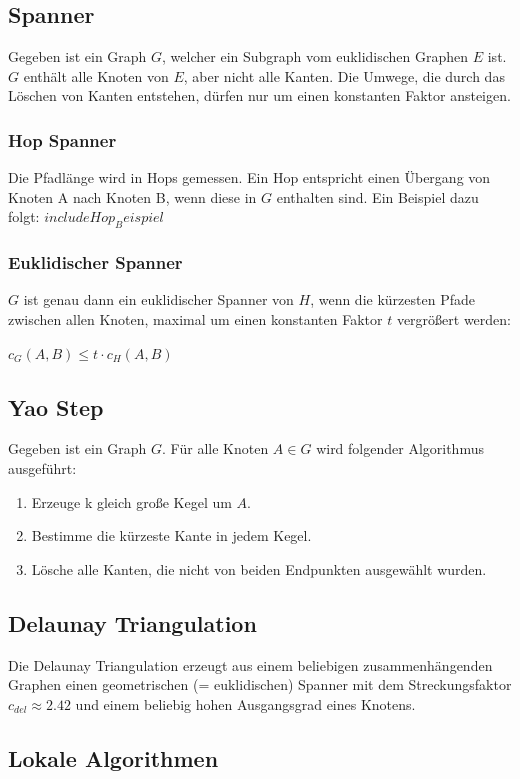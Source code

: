 \documentclass[a4paper,twoside]{IEEEtran}
\begin{document}
\subsection{Spanner}
Gegeben ist ein Graph $G $, welcher ein Subgraph vom euklidischen Graphen $E $ ist. $G $ enthält alle Knoten von $E $, aber nicht alle Kanten. Die Umwege, die durch das Löschen von Kanten entstehen, dürfen nur um einen konstanten Faktor ansteigen. 

\subsubsection{Hop Spanner}
Die Pfadlänge wird in Hops gemessen. Ein Hop entspricht einen Übergang von Knoten A nach Knoten B, wenn diese in $G $ enthalten sind. Ein Beispiel dazu folgt:
$include Hop_Beispiel $
\subsubsection{Euklidischer Spanner}
$G $ ist genau dann ein euklidischer Spanner von $H $, wenn die kürzesten Pfade zwischen allen Knoten, maximal um einen konstanten Faktor $t $ vergrößert werden:

$c_G(A,B) \leq t \cdot c_H(A,B) $

\subsection{Yao Step}
Gegeben ist ein Graph $G $. Für alle Knoten $A \in G $ wird folgender Algorithmus ausgeführt:
\begin{enumerate}
\item Erzeuge k gleich große Kegel um $A $.
\item Bestimme die kürzeste Kante in jedem Kegel.
\item Lösche alle Kanten, die nicht von beiden Endpunkten ausgewählt wurden.

\end{enumerate} 

\subsection{Delaunay Triangulation}
Die Delaunay Triangulation erzeugt aus einem beliebigen zusammenhängenden Graphen einen geometrischen (= euklidischen) Spanner mit dem Streckungsfaktor $c_{del} \approx 2.42 $ und einem beliebig hohen Ausgangsgrad eines Knotens.

\subsection{Lokale Algorithmen}
\end{document}
